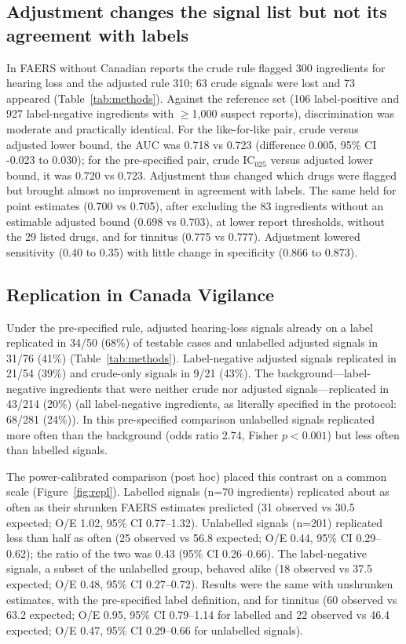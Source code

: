 \subsection{Adjustment changes the signal list but not its agreement with labels}
In FAERS without Canadian reports the crude rule flagged 300 ingredients for hearing loss and the adjusted
rule 310; 63 crude signals were lost and 73 appeared
(Table~\ref{tab:methods}). Against the reference set (106 label-positive and 927 label-negative
ingredients with $\geq$1{,}000 suspect reports), discrimination was moderate and practically identical. For the
like-for-like pair, crude versus adjusted lower bound, the AUC was 0.718 vs
0.723 (difference 0.005, 95\% CI -0.023 to
0.030); for the pre-specified pair, crude IC$_{025}$ versus adjusted lower bound, it was
0.720 vs 0.723. Adjustment thus changed which drugs were flagged
but brought almost no improvement in agreement with labels. The same held for point estimates (0.700 vs
0.705), after excluding the 83 ingredients without an estimable
adjusted bound (0.698 vs
0.703), at lower report thresholds, without the 29 listed
drugs, and for tinnitus (0.775 vs 0.777). Adjustment lowered
sensitivity (0.40 to 0.35) with little change in specificity
(0.866 to 0.873).

\subsection{Replication in Canada Vigilance}
Under the pre-specified rule, adjusted hearing-loss signals already on a label replicated in 34/50 (68\%)
of testable cases and unlabelled adjusted signals in 31/76 (41\%) (Table~\ref{tab:methods}).
Label-negative adjusted signals replicated in 21/54 (39\%) and crude-only signals in
9/21 (43\%). The background---label-negative ingredients that were neither crude nor adjusted signals---replicated
in 43/214 (20\%) (all label-negative ingredients, as literally specified in the protocol:
68/281 (24\%)). In this pre-specified comparison unlabelled signals replicated more
often than the background (odds ratio 2.74, Fisher $p<0.001$) but less
often than labelled signals.

The power-calibrated comparison (post hoc) placed this contrast on a common scale (Figure~\ref{fig:repl}). Labelled signals
(n=70 ingredients) replicated about as often as their shrunken FAERS estimates predicted
(31 observed vs 30.5 expected; O/E 1.02, 95\% CI 0.77--1.32). Unlabelled signals (n=201) replicated less than half as often
(25 observed vs 56.8 expected; O/E 0.44, 95\% CI 0.29--0.62); the ratio of the two was 0.43
(95\% CI 0.26--0.66). The
label-negative signals, a subset of the unlabelled group, behaved alike (18 observed vs 37.5 expected; O/E 0.48, 95\% CI 0.27--0.72). Results were the
same with unshrunken estimates, with the pre-specified label definition, and for tinnitus (60 observed vs 63.2 expected; O/E 0.95, 95\% CI 0.79--1.14 for
labelled and 22 observed vs 46.4 expected; O/E 0.47, 95\% CI 0.29--0.66 for unlabelled signals).

